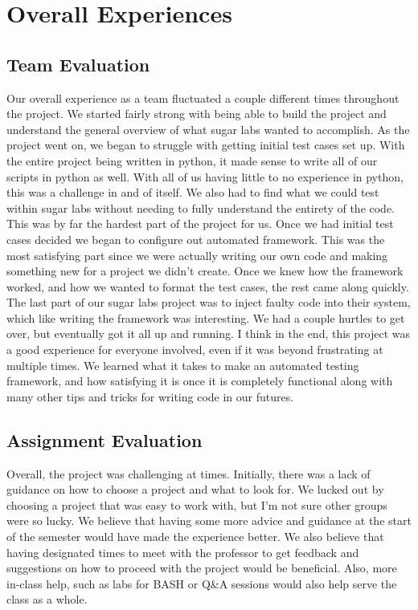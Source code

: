 \documentclass{article}
\begin{document}
\section{Overall Experiences}
\subsection{Team Evaluation}
Our overall experience as a team fluctuated a couple different times throughout the project. We started fairly strong with being able to build the project and understand the general overview of what sugar labs wanted to accomplish. As the project went on, we began to struggle with getting initial test cases set up. With the entire project being written in python, it made sense to write all of our scripts in python as well. With all of us having little to no experience in python, this was a challenge in and of itself. We also had to find what we could test within sugar labs without needing to fully understand the entirety of the code. This was by far the hardest part of the project for us. Once we had initial test cases decided we began to configure out automated framework. This was the most satisfying part since we were actually writing our own code and making something new for a project we didn’t create. Once we knew how the framework worked, and how we wanted to format the test cases, the rest came along quickly. The last part of our sugar labs project was to inject faulty code into their system, which like writing the framework was interesting. We had a couple hurtles to get over, but eventually got it all up and running. I think in the end, this project was a good experience for everyone involved, even if it was beyond frustrating at multiple times. We learned what it takes to make an automated testing framework, and how satisfying it is once it is completely functional along with many other tips and tricks for writing code in our futures. 
\subsection{Assignment Evaluation}
Overall, the project was challenging at times. Initially, there was a lack of guidance on how to choose a project and what to look for. We lucked out by choosing a project that was easy to work with, but I’m not sure other groups were so lucky. We believe that having some more advice and guidance at the start of the semester would have made the experience better. We also believe that having designated times to meet with the professor to get feedback and suggestions on how to proceed with the project would be beneficial. Also, more in-class help, such as labs for BASH or Q\&A sessions would also help serve the class as a whole.
\end{document}
